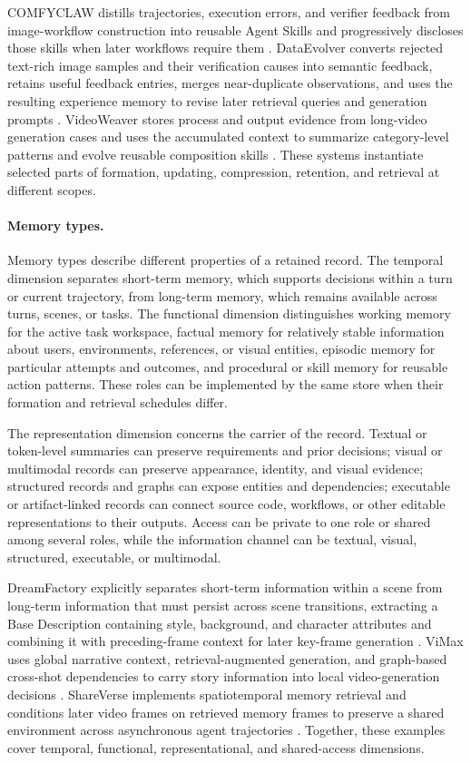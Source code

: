 COMFYCLAW distills trajectories, execution errors, and verifier feedback from image-workflow construction into reusable Agent Skills and progressively discloses those skills when later workflows require them \cite{avg260701709}. DataEvolver converts rejected text-rich image samples and their verification causes into semantic feedback, retains useful feedback entries, merges near-duplicate observations, and uses the resulting experience memory to revise later retrieval queries and generation prompts \cite{avg260631537}. VideoWeaver stores process and output evidence from long-video generation cases and uses the accumulated context to summarize category-level patterns and evolve reusable composition skills \cite{avg260608091}. These systems instantiate selected parts of formation, updating, compression, retention, and retrieval at different scopes.

\paragraph{Memory types.}
Memory types describe different properties of a retained record. The temporal dimension separates short-term memory, which supports decisions within a turn or current trajectory, from long-term memory, which remains available across turns, scenes, or tasks. The functional dimension distinguishes working memory for the active task workspace, factual memory for relatively stable information about users, environments, references, or visual entities, episodic memory for particular attempts and outcomes, and procedural or skill memory for reusable action patterns. These roles can be implemented by the same store when their formation and retrieval schedules differ.

The representation dimension concerns the carrier of the record. Textual or token-level summaries can preserve requirements and prior decisions; visual or multimodal records can preserve appearance, identity, and visual evidence; structured records and graphs can expose entities and dependencies; executable or artifact-linked records can connect source code, workflows, or other editable representations to their outputs. Access can be private to one role or shared among several roles, while the information channel can be textual, visual, structured, executable, or multimodal.

DreamFactory explicitly separates short-term information within a scene from long-term information that must persist across scene transitions, extracting a Base Description containing style, background, and character attributes and combining it with preceding-frame context for later key-frame generation \cite{xie2024dreamfactory}. ViMax uses global narrative context, retrieval-augmented generation, and graph-based cross-shot dependencies to carry story information into local video-generation decisions \cite{huang2026vimax}. ShareVerse implements spatiotemporal memory retrieval and conditions later video frames on retrieved memory frames to preserve a shared environment across asynchronous agent trajectories \cite{avg260302697}. Together, these examples cover temporal, functional, representational, and shared-access dimensions.

